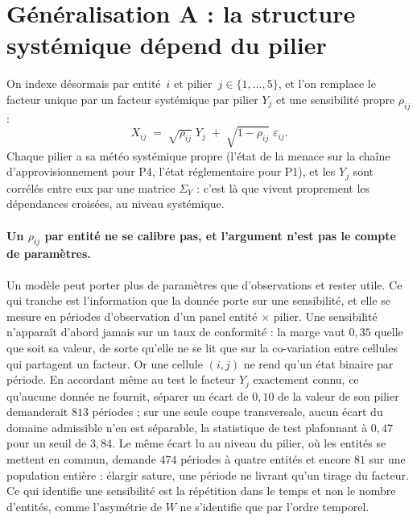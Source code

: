 
\section{Généralisation A : la structure systémique dépend du pilier}

On indexe désormais par entité~$i$ et pilier~$j\in\{1,\dots,5\}$, et l'on remplace le facteur
unique par un facteur systémique par pilier $Y_j$ et une sensibilité propre
$\rho_{ij}$ :
\begin{equation}
X_{ij} \;=\; \sqrt{\rho_{ij}}\;Y_j \;+\; \sqrt{1-\rho_{ij}}\;\varepsilon_{ij}.
\end{equation}
Chaque pilier a sa \og météo systémique\fg{} propre (l'état de la menace sur la chaîne
d'approvisionnement pour P4, l'état réglementaire pour P1), et les $Y_j$ sont corrélés entre eux
par une matrice $\Sigma_Y$ : c'est là que vivent proprement les dépendances croisées, au niveau
systémique.

\paragraph{Un $\rho_{ij}$ par entité ne se calibre pas, et l'argument n'est pas le compte de
paramètres.} Un modèle peut porter plus de paramètres que d'observations et rester utile. Ce qui
tranche est l'information que la donnée porte sur une sensibilité, et elle se mesure en périodes
d'observation d'un panel entité $\times$ pilier. Une sensibilité n'apparaît d'abord jamais sur un
taux de conformité : la marge vaut $0{,}35$ quelle que soit sa valeur, de sorte qu'elle ne se lit
que sur la co-variation entre cellules qui partagent un facteur. Or une cellule $(i,j)$ ne rend
qu'un état binaire par période. En accordant même au test le facteur $Y_j$ exactement connu, ce
qu'aucune donnée ne fournit, séparer un écart de $0{,}10$ de la valeur de son pilier demanderait
$813$ périodes ; sur une seule coupe transversale, aucun écart du domaine admissible n'en est
séparable, la statistique de test plafonnant à $0{,}47$ pour un seuil de $3{,}84$. Le même écart
lu au niveau du pilier, où les entités se mettent en commun, demande $474$ périodes à quatre
entités et encore $81$ sur une population entière : élargir sature, une période ne livrant qu'un
tirage du facteur. Ce qui identifie une sensibilité est la répétition dans le temps et non le
nombre d'entités, comme l'asymétrie de $W$ ne s'identifie que par l'ordre temporel.

